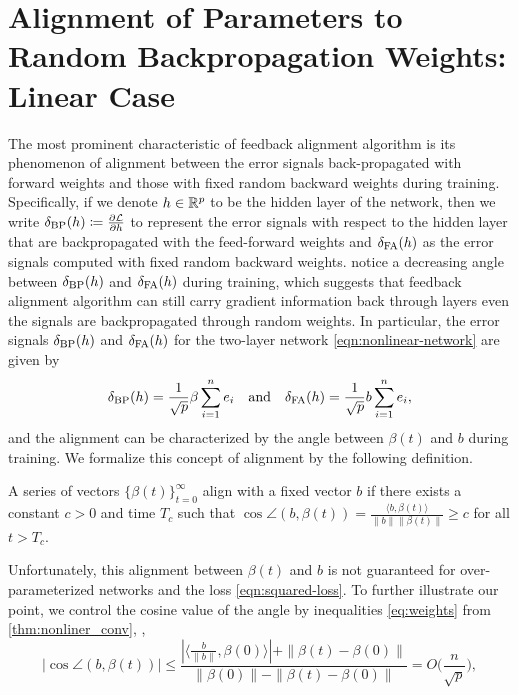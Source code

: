 
\section{Alignment of Parameters to Random Backpropagation Weights: Linear Case}\label{sec:alignment}

The most prominent characteristic of feedback alignment algorithm is its phenomenon of alignment between the error signals back-propagated with forward weights and those with fixed random backward weights during training. Specifically, if we denote $h\in \mathbb{R}^p$ to be the hidden layer of the network, then we write $\delta_\mathrm{BP}(h) \coloneqq \frac{\partial \mathcal{L}}{\partial h}$ to represent the error signals with respect to the hidden layer that are backpropagated with the feed-forward weights and $\delta_\mathrm{FA}(h)$ as the error signals computed with fixed random backward weights.
\citet{lillicrap2016random} notice a decreasing angle between $\delta_\mathrm{BP}(h)$ and $\delta_\mathrm{FA}(h)$ during training, which suggests that feedback alignment algorithm can still carry gradient information back through layers even the signals are backpropagated through random weights.
In particular, the error signals $\delta_\mathrm{BP}(h)$ and $\delta_\mathrm{FA}(h)$ for the two-layer network \eqref{eqn:nonlinear-network} are given by 
\begin{equation}
    \delta_\mathrm{BP}(h) = \frac{1}{\sqrt{p}}\beta\sum_{i=1}^ne_i \quad\text{and}\quad \delta_\mathrm{FA}(h) = \frac{1}{\sqrt{p}}b\sum_{i=1}^ne_i,
\end{equation}
and the alignment can be characterized by the angle between $\beta(t)$ and $b$ during training. We formalize this concept of alignment by the following definition.
\begin{definition}\label{def:alignment}
    A series of vectors $\{\beta(t)\}_{t=0}^\infty$ align with a fixed vector $b$ if there exists a constant $c>0$ and time $T_c$ such that  $\cos\angle(b, \beta(t)) = \frac{\langle b, \beta(t)\rangle}{\|b\|\|\beta(t)\|} \geq c$ for all $t > T_c$.
\end{definition}
Unfortunately, this alignment between $\beta(t)$ and $b$ is not guaranteed for over-parameterized networks and the loss \eqref{eqn:squared-loss}. To further illustrate our point, we control the cosine value of the angle by inequalities \eqref{eq:weights} from \cref{thm:nonliner_conv}, \ie,
\begin{equation}
    \Big|\cos\angle(b, \beta(t))\Big| \leq \frac{|\langle \frac{b}{\|b\|}, \beta(0)\rangle|+ \|\beta(t)- \beta(0)\|}{\|\beta(0)\|-\|\beta(t)-\beta(0)\|} = O\big(\frac{n}{\sqrt p}\big),
\end{equation}
